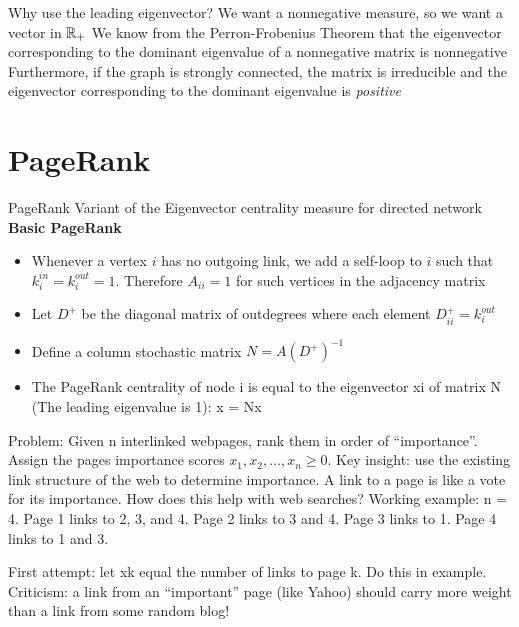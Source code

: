 \documentclass[aspectratio=169]{beamer}
\begin{document}
\begin{frame}{Why use the leading eigenvector?}
	We want a nonnegative measure, so we want a vector in $\mathbb{R}_+$
	\vfill
	We know from the Perron-Frobenius Theorem that the eigenvector corresponding to the dominant eigenvalue of a nonnegative matrix is nonnegative
	\vfill
	Furthermore, if the graph is strongly connected, the matrix is irreducible and the eigenvector corresponding to the dominant eigenvalue is \emph{positive}
\end{frame}



\section{PageRank}

\begin{frame}{PageRank}
Variant of the Eigenvector centrality measure for directed network
\vfill
\textbf{Basic PageRank}
\begin{itemize}
\item Whenever a vertex $i$ has no outgoing link, we add a self-loop to $i$ such that $k^{in}_i=k^{out}_i=1$. Therefore $A_{ii}=1$ for such vertices in the adjacency matrix
\item Let $D^+$ be the diagonal matrix of outdegrees where each element $D_{ii}^+ = k_i^{out}$
\item Define a column stochastic matrix $N = A(D^+)^{-1}$
\item
The PageRank centrality of node i is equal to the 
eigenvector xi of matrix N (The leading eigenvalue is 1):
x = Nx
\end{itemize}
\end{frame}


\begin{frame}{}
	Problem: Given n interlinked webpages, rank them in order of
“importance”.
Assign the pages importance scores $x_1, x_2,\ldots, x_n\geq 0$.
Key insight: use the existing link structure of the web to
determine importance. A link to a page is like a vote for its
importance.
How does this help with web searches?
Working example: n = 4. Page 1 links to 2, 3, and 4. Page 2
links to 3 and 4. Page 3 links to 1. Page 4 links to 1 and 3.
\end{frame}


\begin{frame}{}
	First attempt: let xk equal the number of links to page k.
Do this in example.
Criticism: a link from an “important” page (like Yahoo)
should carry more weight than a link from some random blog!
\end{frame}
\end{document}
